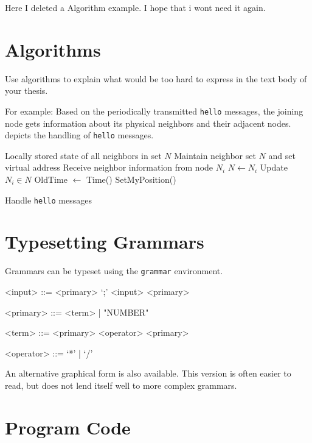 \documentclass[]{ccs-thesis}
\begin{document}
{Here I deleted a Algorithm example. I hope that i wont need it again.

\clearpage
\section{Algorithms}

Use algorithms to explain what would be too hard to express in the text body of your thesis.

For example: Based on the periodically transmitted \texttt{hello} messages, the joining node gets information about its physical neighbors and their adjacent nodes.
 depicts the handling of \texttt{hello} messages.

\begin{algorithm}
\begin{algorithmic}[1]
\REQUIRE Locally stored state of all neighbors in set $N$
\ENSURE Maintain neighbor set $N$ and set virtual address
\STATE Receive neighbor information from node $N_i$
	\STATE $N \gets N_i$
\ELSE
	\STATE Update $N_i \in N$
\ENDIF
{}
	\STATE OldTime $\gets$ Time()
	\STATE SetMyPosition()
\ENDIF
\end{algorithmic}
\caption{Handle \texttt{hello} messages}
\label{alg:H_hello}
\end{algorithm}

\clearpage
\section{Typesetting Grammars}

Grammars can be typeset using the \texttt{grammar} environment.

\begin{grammar}\label{stx:demo}

<input> ::= <primary> `;' <input> \alt <primary> \alt \empty

<primary> ::= <term> | "NUMBER"

<term> ::= <primary> <operator> <primary>

<operator> ::= `*' | `/'

\end{grammar}

An alternative graphical form is also available.
This version is often easier to read, but does not lend itself well to more complex grammars.


\clearpage
\section{Program Code}

}
\end{document}
